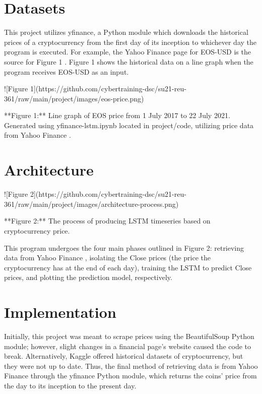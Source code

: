 \documentclass[acmtog,authorversion]{acmart}
\newcommand{\TODO}[2]{\todo[inline]{#1: #2}}
\begin{document}
\section{Datasets}

This project utilizes yfinance, a Python module which downloads the historical prices of a cryptocurrency from the first day of its inception to whichever day the program is executed. For example, the Yahoo Finance page for EOS-USD is the source for Figure 1 \cite{c-4}. Figure 1 shows the historical data on a line graph when the program receives EOS-USD as an input.

\TODO{jp}{image must be in images dir in latex}
![Figure 1](https://github.com/cybertraining-dsc/su21-reu-361/raw/main/project/images/eos-price.png)

**Figure 1:** Line graph of EOS price from 1 July 2017 to 22 July 2021. Generated using yfinance-lstm.ipynb \cite{c-13} located in project/code, utilizing price data from Yahoo Finance \cite{c-4}.

\section{Architecture}

![Figure 2](https://github.com/cybertraining-dsc/su21-reu-361/raw/main/project/images/architecture-process.png)

**Figure 2:** The process of producing LSTM timeseries based on cryptocurrency price.

This program undergoes the four main phases outlined in Figure 2: retrieving data from Yahoo Finance \cite{c-4}, isolating the Close prices (the price the cryptocurrency has at the end of each day), training the LSTM to predict Close prices, and plotting the prediction model, respectively.

\section{Implementation}

Initially, this project was meant to scrape prices using the BeautifulSoup Python module; however, slight changes in a financial page's website caused the code to break. Alternatively, Kaggle offered historical datasets of cryptocurrency, but they were not up to date. Thus, the final method of retrieving data is from Yahoo Finance through the yfinance Python module, which returns the coins' price from the day to its inception to the present day.
\end{document}
